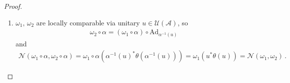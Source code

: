 \documentclass[a4paper,10pt]{article}
\numberwithin{equation}{section}
\theoremstyle{plain}
\theoremstyle{plain}
\theoremstyle{plain}
\theoremstyle{plain}
\theoremstyle{plain}
\theoremstyle{remark}
\theoremstyle{definition}
\newcommand{\calA}{\mathcal{A}}
\newcommand{\calN}{\mathcal{N}}
\newcommand{\calU}{\mathcal{U}}
\newcommand{\calH}{\mathcal{H}}
\newcommand\norm[1]{\left\lVert#1\right\rVert}
\newcommand{\ip}[2]{\langle #1, #2 \rangle}
\newcommand{\eq}[1]{\begin{align*}#1\end{align*}}
\newcommand{\eql}[1]{\begin{align}#1\end{align}}
\begin{document}
\begin{proof}
\begin{enumerate}
    Let \((\pi,\calH,\Omega_1)\) be the GNS representation of
    \(\omega_1\), and set
    \eq{
        \Omega_2:=\pi(u)\Omega_1\,.
    }
    Then \(\Omega_2\) implements \(\omega_2\) in the same representation.
    Since \(\omega_1\) is \(\theta\)-invariant, there is a unitary
    involution \(\Theta\) on \(\calH\) defined by
    \eq{
        \Theta\pi(a)\Omega_1=\pi(\theta(a))\Omega_1,
        \qquad a\in\calA\,.
    }
    In particular, \(\Theta\Omega_1=\Omega_1\). Moreover,
    \eq{
        \Theta\Omega_2
        =\Theta\pi(u)\Omega_1
        =\pi(\theta(u))\Omega_1\, ,
    }
    and therefore
    \eq{
        \calN(\omega_1,\omega_2)
        =
        \omega_1(u^*\theta(u))
        =
        \ip{\pi(u)\Omega_1}{\pi(\theta(u))\Omega_1}
        =
        \ip{\Omega_2}{\Theta\Omega_2}\,.
    }
    Suppose, for contradiction, that
    \(\calN(\omega_1,\omega_2)=-1\). Since \(\Theta\) is unitary and
    \(\Omega_2\) is a unit vector, the equality
    \(\ip{\Omega_2}{\Theta\Omega_2}=-1\) implies
    \eq{
        \Theta\Omega_2=-\Omega_2\,.
    }
    Thus \(\Omega_1\) and \(\Omega_2\) lie in the \(+1\) and \(-1\)
    eigenspaces of the self-adjoint unitary \(\Theta\), respectively, and
    hence
    \eq{
        \ip{\Omega_1}{\Omega_2}=0\,.
    }
    By the Powers--St{\o}rmer vector-state distance formula
    \cite[Lemma~2.4]{PowersStormer1970FreeStates},
     \eql{
        \norm{\omega_1-\omega_2}
        =
        2\sqrt{1-\left|\ip{\Omega_1}{\Omega_2}\right|^2}
        =
        2\, ,
    }
    contradicting the hypothesis \(\norm{\omega_1-\omega_2}<2\). Hence
    \(\calN(\omega_1,\omega_2)\neq -1\). Since the previous item shows
    that \(\calN(\omega_1,\omega_2)\in\Set{\pm1}\), we conclude that
    \eq{
        \calN(\omega_1,\omega_2)=+1\,.
    }
\item $\omega_1, \, \omega_2$ are locally comparable via unitary $u \in \calU(\calA)$, so 
\eq{\omega_2 \circ \alpha = (\omega_1 \circ \alpha) \circ \text{Ad}_{\alpha^{-1}(u)} } 
and 
\eq{
\calN(\omega_1 \circ \alpha, \omega_2 \circ \alpha) = \omega_1 \circ \alpha (\alpha^{-1}(u)^* \theta(\alpha^{-1}(u)))  = \omega_1 (u^*\theta(u)) = \calN(\omega_1, \omega_2)\,.
}


\end{enumerate}
\end{proof}
\end{document}
